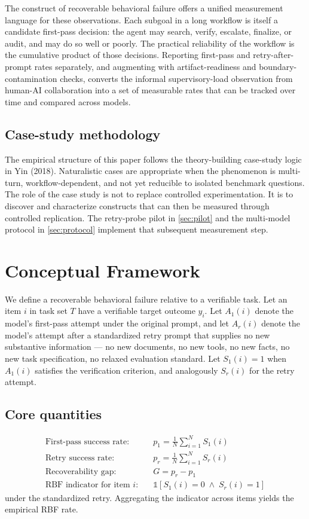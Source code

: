 \documentclass[11pt]{article}
\newcommand{\Sone}{S_{1}}
\newcommand{\Sr}{S_{r}}
\newcommand{\pone}{p_{1}}
\newcommand{\pr}{p_{r}}
\begin{document}
The construct of recoverable behavioral failure offers a unified measurement language for these observations. Each subgoal in a long workflow is itself a candidate first-pass decision: the agent may search, verify, escalate, finalize, or audit, and may do so well or poorly. The practical reliability of the workflow is the cumulative product of those decisions. Reporting first-pass and retry-after-prompt rates separately, and augmenting with artifact-readiness and boundary-contamination checks, converts the informal supervisory-load observation from human-AI collaboration into a set of measurable rates that can be tracked over time and compared across models.

\subsection{Case-study methodology}
The empirical structure of this paper follows the theory-building case-study logic in Yin (2018). Naturalistic cases are appropriate when the phenomenon is multi-turn, workflow-dependent, and not yet reducible to isolated benchmark questions. The role of the case study is not to replace controlled experimentation. It is to discover and characterize constructs that can then be measured through controlled replication. The retry-probe pilot in \cref{sec:pilot} and the multi-model protocol in \cref{sec:protocol} implement that subsequent measurement step.

\section{Conceptual Framework}

We define a recoverable behavioral failure relative to a verifiable task. Let an item $i$ in task set $T$ have a verifiable target outcome $y_i$. Let $A_1(i)$ denote the model's first-pass attempt under the original prompt, and let $A_r(i)$ denote the model's attempt after a standardized retry prompt that supplies no new substantive information --- no new documents, no new tools, no new facts, no new task specification, no relaxed evaluation standard. Let $\Sone(i) = 1$ when $A_1(i)$ satisfies the verification criterion, and analogously $\Sr(i)$ for the retry attempt.

\subsection{Core quantities}
\begin{align}
\text{First-pass success rate:}\quad & \pone = \frac{1}{N} \sum_{i=1}^{N} \Sone(i) \\
\text{Retry success rate:}\quad     & \pr   = \frac{1}{N} \sum_{i=1}^{N} \Sr(i)   \\
\text{Recoverability gap:}\quad     & G     = \pr - \pone \\
\text{RBF indicator for item $i$:}\quad & \mathbb{1}\!\left[\Sone(i) = 0 \;\wedge\; \Sr(i) = 1\right]
\end{align}
under the standardized retry. Aggregating the indicator across items yields the empirical RBF rate.
\end{document}
